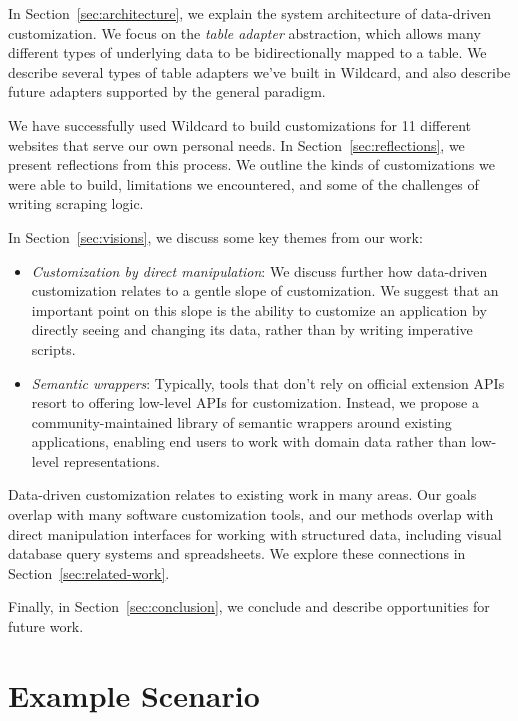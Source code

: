 \documentclass[sigplan,screen,10pt,anonymous,review]{acmart}
\providecommand{\tightlist}{%
  \setlength{\itemsep}{0pt}\setlength{\parskip}{0pt}}
\begin{document}
In Section~\ref{sec:architecture}, we explain the system architecture of
data-driven customization. We focus on the \emph{table adapter}
abstraction, which allows many different types of underlying data to be
bidirectionally mapped to a table. We describe several types of table
adapters we've built in Wildcard, and also describe future adapters
supported by the general paradigm.

We have successfully used Wildcard to build customizations for 11
different websites that serve our own personal needs. In
Section~\ref{sec:reflections}, we present reflections from this process.
We outline the kinds of customizations we were able to build,
limitations we encountered, and some of the challenges of writing
scraping logic.

In Section~\ref{sec:visions}, we discuss some key themes from our work:

\begin{itemize}
\tightlist
\item
  \emph{Customization by direct manipulation}: We discuss further how
  data-driven customization relates to a gentle slope of customization.
  We suggest that an important point on this slope is the ability to
  customize an application by directly seeing and changing its data,
  rather than by writing imperative scripts.
\item
  \emph{Semantic wrappers}: Typically, tools that don't rely on official
  extension APIs resort to offering low-level APIs for customization.
  Instead, we propose a community-maintained library of semantic
  wrappers around existing applications, enabling end users to work with
  domain data rather than low-level representations.
\end{itemize}

Data-driven customization relates to existing work in many areas. Our
goals overlap with many software customization tools, and our methods
overlap with direct manipulation interfaces for working with structured
data, including visual database query systems and spreadsheets. We
explore these connections in Section~\ref{sec:related-work}.

Finally, in Section~\ref{sec:conclusion}, we conclude and describe
opportunities for future work.

\hypertarget{sec:example}{%
\section{Example Scenario}\label{sec:example}}
\end{document}
